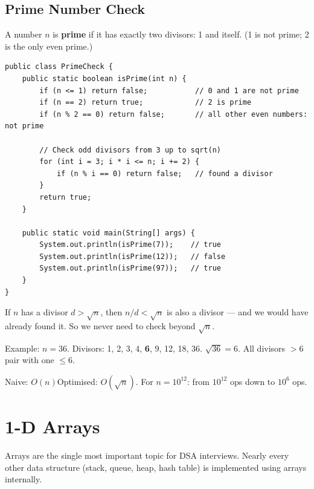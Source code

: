 \documentclass[12pt,a4paper,oneside]{book}
\begin{document}
\section{Prime Number Check}

A number $n$ is \textbf{prime} if it has exactly two divisors: 1 and itself. (1 is not prime; 2 is the only even prime.)

\begin{lstlisting}[caption={Is Prime? --- Optimised $O(\sqrt{n})$ check}]
public class PrimeCheck {
    public static boolean isPrime(int n) {
        if (n <= 1) return false;           // 0 and 1 are not prime
        if (n == 2) return true;            // 2 is prime
        if (n % 2 == 0) return false;       // all other even numbers: not prime

        // Check odd divisors from 3 up to sqrt(n)
        for (int i = 3; i * i <= n; i += 2) {
            if (n % i == 0) return false;   // found a divisor
        }
        return true;
    }

    public static void main(String[] args) {
        System.out.println(isPrime(7));    // true
        System.out.println(isPrime(12));   // false
        System.out.println(isPrime(97));   // true
    }
}
\end{lstlisting}

\begin{tipbox}
If $n$ has a divisor $d > \sqrt{n}$, then $n/d < \sqrt{n}$ is also a divisor --- and we would have already found it. So we never need to check beyond $\sqrt{n}$.

Example: $n = 36$. Divisors: 1, 2, 3, 4, \textbf{6}, 9, 12, 18, 36. $\sqrt{36} = 6$. All divisors $> 6$ pair with one $\leq 6$.
\end{tipbox}

\begin{complexity}
Naive: $O(n)$\quad Optimised: $O(\sqrt{n})$. For $n = 10^{12}$: from $10^{12}$ ops down to $10^6$ ops.
\end{complexity}

\chapter{1-D Arrays}

Arrays are the single most important topic for DSA interviews. Nearly every other data structure (stack, queue, heap, hash table) is implemented using arrays internally.
\end{document}
